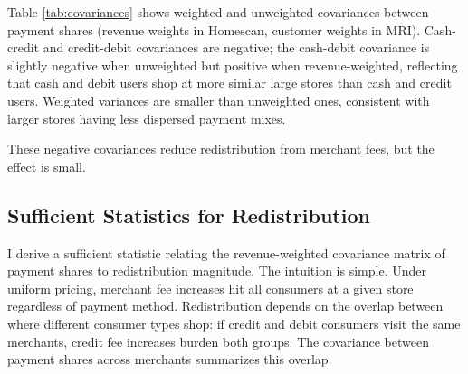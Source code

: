 \documentclass[main.tex]{subfiles}
\begin{document}
Table \ref{tab:covariances} shows weighted and unweighted covariances between payment shares (revenue weights in Homescan, customer weights in MRI).
Cash-credit and credit-debit covariances are negative; the cash-debit covariance is slightly negative when unweighted but positive when revenue-weighted, reflecting that cash and debit users shop at more similar large stores than cash and credit users.
Weighted variances are smaller than unweighted ones, consistent with larger stores having less dispersed payment mixes.

\begin{table}[ht!]
    \caption{Covariances}
    \label{tab:covariances}
    \centering
        \begin{minipage}{0.5\textwidth}
        \centering
        
        \vspace{4pt}
        
        \end{minipage}\hfill
        \begin{minipage}{0.5\textwidth}
        \centering
        
        \vspace{4pt}
        
        \end{minipage}
\end{table}

These negative covariances reduce redistribution from merchant fees, but the effect is small.

\subsection{Sufficient Statistics for Redistribution}

I derive a sufficient statistic relating the revenue-weighted covariance matrix of payment shares to redistribution magnitude.
The intuition is simple.
Under uniform pricing, merchant fee increases hit all consumers at a given store regardless of payment method.
Redistribution depends on the overlap between where different consumer types shop: if credit and debit consumers visit the same merchants, credit fee increases burden both groups.
The covariance between payment shares across merchants summarizes this overlap.
\end{document}
